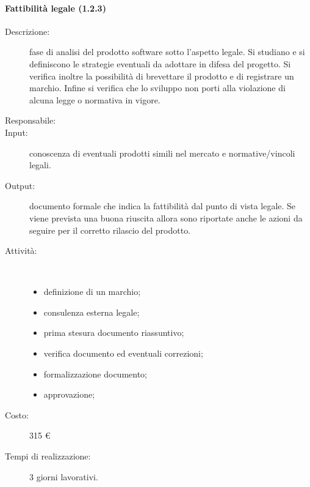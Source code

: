 \paragraph{Fattibilit\`{a} legale (1.2.3)}
\begin{description}
\item[Descrizione:] fase di analisi del prodotto software sotto l'aspetto legale. Si studiano e si definiscono le strategie eventuali da adottare in difesa del progetto. Si verifica inoltre la possibilit\`{a} di brevettare il prodotto e di registrare un marchio. Infine si verifica che lo sviluppo non porti alla violazione di alcuna legge o normativa in vigore.
\item[Responsabile:]
\item[Input:] conoscenza di eventuali prodotti simili nel mercato e normative/vincoli legali.
\item[Output:] documento formale che indica la fattibilità dal punto di vista legale. Se viene prevista una buona riuscita allora sono riportate anche le azioni da seguire per il corretto rilascio del prodotto.
\item[Attività:]\mbox{}\\[-1.5\baselineskip]
	\begin{itemize}
	\item definizione di un marchio;
	\item consulenza esterna legale;
	\item prima stesura documento riassuntivo;
	\item verifica documento ed eventuali correzioni;
	\item formalizzazione documento;
	\item approvazione;
	\end{itemize}

\item[Costo:] 315 \euro{}
\item[Tempi di realizzazione:] 3 giorni lavorativi.
\end{description}
